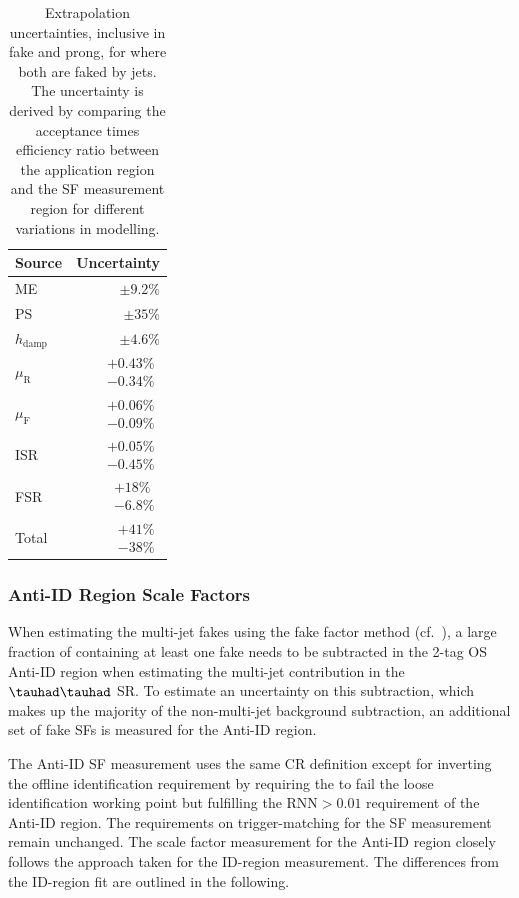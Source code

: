 \begin{table}[htbp]
  \centering
  \begin{tabular}{lr}
    \toprule
    Source & Uncertainty \\
    \midrule
    ME & $\pm 9.2 \%$ \\[0.2em]
    PS & $\pm 35 \%$ \\[0.2em]
    $h_\text{damp}$ & $\pm 4.6 \%$ \\[0.2em]
    $\mu_\text{R}$ & $\substack{+0.43 \% \\ -0.34 \%}$ \\[0.2em]
    $\mu_\text{F}$ & $\substack{+0.06 \% \\ -0.09 \%}$ \\[0.2em]
    ISR & $\substack{+0.05 \% \\ -0.45 \%}$ \\[0.2em]
    FSR & $\substack{+18 \% \\ -6.8 \%}$ \\[0.2em]
    \midrule
    Total & $\substack{+41 \% \\ -38 \%}$ \\[0.2em]
    \bottomrule
  \end{tabular}
  \caption{Extrapolation uncertainties, inclusive in fake \tauhad \pT
    and prong, for \ttbar where both \tauhad are faked by jets. The
    uncertainty is derived by comparing the acceptance times
    efficiency ratio between the \hadhad application region and the
    \lephad SF measurement region for different variations in \ttbar
    modelling.}
  \label{tab:ttbar_fake_sf_extrapol_ff}
\end{table}


\FloatBarrier
\subsubsection{Anti-ID Region Scale Factors}
\label{sssec:ttbar_fake_sf_antiid}

When estimating the multi-jet fakes using the fake factor method
(cf.~), a large fraction of \ttbar
containing at least one fake \tauhad needs to be subtracted in the
2-tag OS Anti-ID region when estimating the multi-jet contribution in
the $\tauhad\tauhad$ SR. To estimate an uncertainty on this
subtraction, which makes up the majority of the non-multi-jet
background subtraction, an additional set of fake \tauhad SFs is
measured for the Anti-ID region.

The Anti-ID SF measurement uses the same CR definition except for
inverting the offline \tauhad identification requirement by requiring
the \tauhad to fail the loose \tauhad identification working point but
fulfilling the $\text{RNN} > 0.01$ requirement of the Anti-ID region.
The requirements on trigger-matching for the SF measurement remain
unchanged. The scale factor measurement for the Anti-ID region closely
follows the approach taken for the ID-region measurement. The
differences from the ID-region fit are outlined in the following.

